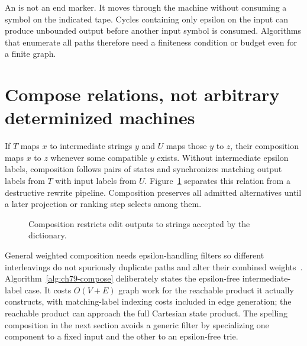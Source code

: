An  is not an end marker.
It moves through the machine without consuming a symbol on the indicated tape.
Cycles containing only epsilon on the input can produce unbounded output before another input symbol is consumed.
Algorithms that enumerate all paths therefore need a finiteness condition or budget even for a finite graph.

\section{Compose relations, not arbitrary determinized machines}
\label{sec:ch79-compose}
If $T$ maps $x$ to intermediate strings $y$ and $U$ maps those $y$ to $z$, their composition maps $x$ to $z$ whenever some compatible $y$ exists.
Without intermediate epsilon labels, composition follows pairs of states and synchronizes matching output labels from $T$ with input labels from $U$.
Figure~\ref{fig:ch79-compose} separates this relation from a destructive rewrite pipeline.
Composition preserves all admitted alternatives until a later projection or ranking step selects among them.

\begin{figure}[htbp]
\centering
{}
\caption{Composition restricts edit outputs to strings accepted by the dictionary.}
\label{fig:ch79-compose}
\end{figure}

General weighted composition needs epsilon-handling filters so different interleavings do not spuriously duplicate paths and alter their combined weights~\cite{mohri-2009-weighted}.
Algorithm~\ref{alg:ch79-compose} deliberately states the epsilon-free intermediate-label case.
It costs $O(V+E)$ graph work for the reachable product it actually constructs, with matching-label indexing costs included in edge generation; the reachable product can approach the full Cartesian state product.
The spelling composition in the next section avoids a generic filter by specializing one component to a fixed input and the other to an epsilon-free trie.

